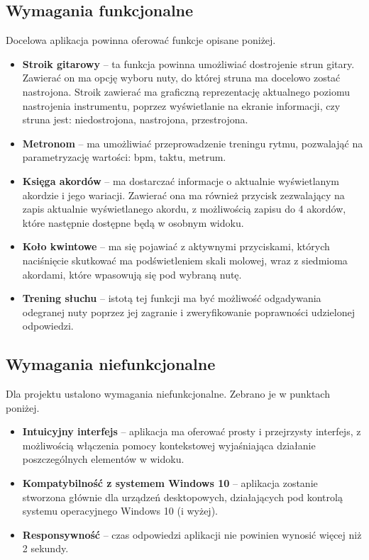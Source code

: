 \subsection{Wymagania funkcjonalne}
Docelowa aplikacja powinna oferować funkcje opisane poniżej.
\begin{itemize}
\item \textbf{Stroik gitarowy} -- ta funkcja powinna umożliwiać dostrojenie strun gitary. Zawierać on ma opcję wyboru nuty, do której struna ma docelowo zostać nastrojona. Stroik zawierać ma graficzną reprezentację aktualnego poziomu nastrojenia instrumentu, poprzez wyświetlanie na ekranie informacji, czy struna jest: niedostrojona, nastrojona, przestrojona.
\item \textbf{Metronom} -- ma umożliwiać przeprowadzenie treningu rytmu, pozwalająć na parametryzację wartości: bpm, taktu, metrum.
\item \textbf{Księga akordów} -- ma dostarczać informacje o aktualnie wyświetlanym akordzie i jego wariacji. Zawierać ona ma również przycisk zezwalający na zapis aktualnie wyświetlanego akordu, z możliwością zapisu do 4 akordów, które następnie dostępne będą w osobnym widoku.
\item \textbf{Koło kwintowe} -- ma się pojawiać z aktywnymi przyciskami, których naciśnięcie skutkować ma podświetleniem skali molowej, wraz z siedmioma akordami, które wpasowują się pod wybraną nutę.
\item \textbf{Trening słuchu} -- istotą tej funkcji ma być możliwość odgadywania odegranej nuty poprzez jej zagranie i zweryfikowanie poprawności udzielonej odpowiedzi. 
\end{itemize}

\subsection{Wymagania niefunkcjonalne}
Dla projektu ustalono wymagania niefunkcjonalne. Zebrano je w punktach poniżej.
\begin{itemize}
\item \textbf{Intuicyjny interfejs} -- aplikacja ma oferować prosty i przejrzysty interfejs, z możliwością włączenia pomocy kontekstowej wyjaśniająca działanie poszczególnych elementów w widoku.
\item \textbf{Kompatybilność z systemem Windows 10} --  aplikacja zostanie stworzona głównie dla urządzeń desktopowych, działających pod kontrolą systemu operacyjnego Windows 10 (i wyżej).
\item \textbf{Responsywność} -- czas odpowiedzi aplikacji nie powinien wynosić więcej niż 2 sekundy. 
\end{itemize}


